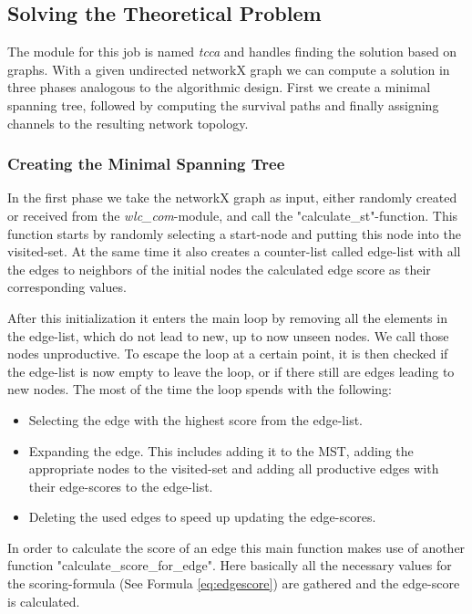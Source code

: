       \clearpage
      \newpage
      
    \subsection{Solving the Theoretical Problem}
      The module for this job is named \textit{tcca} and handles finding the solution based on graphs.
      With a given undirected networkX graph we can compute a solution in three phases analogous to the algorithmic design.
      First we create a minimal spanning tree, followed by computing the survival paths and finally assigning channels to the resulting network topology.

      \subsubsection{Creating the Minimal Spanning Tree}
	In the first phase we take the networkX graph as input, either randomly created or received from the \textit{wlc\_com}-module, and call the "calculate\_st"-function.
	This function starts by randomly selecting a start-node and putting this node into the visited-set. 
	At the same time it also creates a counter-list called edge-list with all the edges to neighbors 
	of the initial nodes the calculated edge score as their corresponding values.
	
	After this initialization it enters the main loop by removing all the elements in the edge-list, which do not lead to new, up to now unseen nodes. 
	We call those nodes unproductive.
	To escape the loop at a certain point, it is then checked if the edge-list is now empty to leave the loop, or if there still are edges leading to new nodes.
	The most of the time the loop spends with the following:
	
	\begin{itemize}
	 \item Selecting the edge with the highest score from the edge-list.
	 
	 \item Expanding the edge. This includes adding it to the \ac{MST}, adding the appropriate nodes to the visited-set and 
	  adding all productive edges with their edge-scores to the edge-list.
	 
	 \item Deleting the used edges to speed up updating the edge-scores.
	\end{itemize}
	
	In order to calculate the score of an edge this main function makes use of another function "calculate\_score\_for\_edge".
	Here basically all the necessary values for the scoring-formula (See Formula \ref{eq:edgescore}) are gathered and the edge-score is calculated.
	
